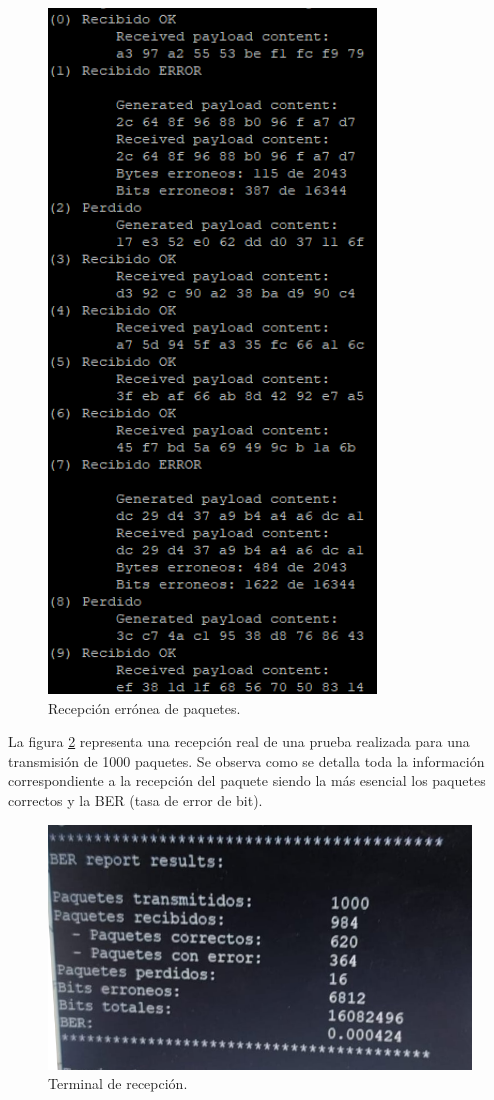 \begin{figure}[ht]
\begin{minipage}{7cm}
		\includegraphics[scale=0.56]{./figuras/putty_rec_fail.png}
		\caption{\small{Recepción errónea de paquetes.}}
		\label{fail}
	  \end{minipage}
\end{figure}

La figura \ref{real} representa una recepción real de una prueba realizada para una 
transmisión
de 1000 paquetes. Se observa como se detalla toda la información correspondiente a la
recepción del paquete siendo la más esencial los paquetes correctos y la BER (tasa de 
error de bit).

\begin{figure}[ht]
    \centering
    \includegraphics[scale=0.50]{./figuras/1.png}
    \caption{\small{Terminal de recepción.}}
    \label{real}%
\end{figure}

